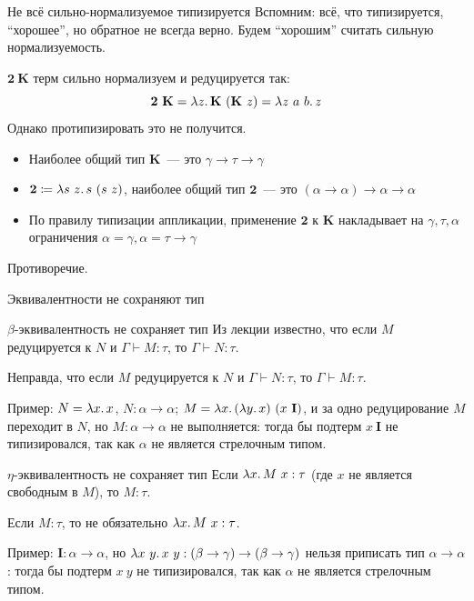 
    \begin{frame}{Не всё сильно-нормализуемое типизируется \advancedslide}
        Вспомним: всё, что типизируется, ``хорошее'', но обратное не всегда верно. Будем ``хорошим'' считать сильную нормализуемость.

        \vspace{1em}
        $\mathbf{2}~\mathbf{K}$ терм сильно нормализуем и редуцируется так:
        \[\mathbf{2}~\mathbf{K} = \lambda z\ldotp \mathbf{K}~(\mathbf{K}~z) = \lambda z~a~b\ldotp z\]
        Однако протипизировать это не получится.
        \begin{itemize}
            \item Наиболее общий тип $\mathbf{K}$~--- это $\gamma \to \tau \to \gamma$
            \item $\mathbf{2} \coloneqq \lambda s~z\ldotp s~(s~z)$, наиболее общий тип $\mathbf{2}$~--- это $(\alpha \to \alpha) \to \alpha \to \alpha$
            \item По правилу типизации аппликации, применение $\mathbf{2}$ к $\mathbf{K}$ накладывает на $\gamma, \tau, \alpha$ ограничения $\alpha = \gamma, \alpha = \tau \to \gamma$
        \end{itemize}
        Противоречие.
    \end{frame}

    \begin{frame}{Эквивалентности не сохраняют тип \advancedslide}
        \begin{block}{$\beta$-эквивалентность не сохраняет тип}
            Из лекции известно, что если $M$ редуцируется к $N$ и $\Gamma \vdash M: \tau$,
            то $\Gamma \vdash N: \tau$.

            Неправда, что если $M$ редуцируется к $N$ и $\Gamma \vdash N: \tau$, то
            $\Gamma \vdash M: \tau$.

            Пример: $N = \lambda x\ldotp x$, $N: \alpha \to
            \alpha$; $M = \lambda x\ldotp (\lambda y\ldotp x)~(x~\mathbf{I})$, и
            за одно редуцирование $M$ переходит в $N$, но $M: \alpha \to \alpha$ не
            выполняется: тогда бы подтерм $x~\mathbf{I}$ не типизировался, так как $\alpha$
            не является стрелочным типом.
        \end{block}
        \begin{block}{$\eta$-эквивалентность не сохраняет тип}
            Если $\lambda x\ldotp M~x: \tau$ (где $x$ не является свободным в $M$), то
            $M: \tau$.

            Если $M: \tau$, то не обязательно $\lambda x \ldotp M~x: \tau$.

            Пример:
            $\mathbf{I}: \alpha \to \alpha$, но $\lambda x~y\ldotp x~y: (\beta \to \gamma) \to
            (\beta \to \gamma)$ нельзя приписать тип $\alpha \to \alpha$: тогда бы подтерм
            $x~y$ не типизировался, так как $\alpha$ не является стрелочным типом.
        \end{block}
    \end{frame}


